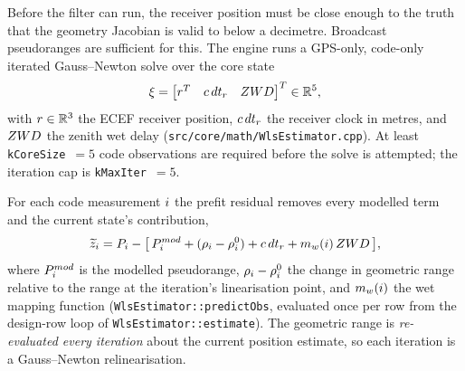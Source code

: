 \documentclass[main.tex]{subfiles}
\begin{document}
Before the filter can run, the receiver position must be close enough to
the truth that the geometry Jacobian
 is valid to below a
decimetre.  Broadcast pseudoranges are sufficient for this.  The engine
runs a GPS-only, code-only iterated Gauss--Newton solve over the core
state
\begin{equation}
\xi = \begin{bmatrix} r^{T} & c\,dt_r & ZWD \end{bmatrix}^{T}
\in\mathbb{R}^{5},
\label{eq:estinfra-wls-state}
\end{equation}
with $r\in\mathbb{R}^3$ the ECEF receiver position, $c\,dt_r$
the receiver clock in metres, and $ZWD$ the zenith wet delay
(\texttt{src/core/math/WlsEstimator.cpp}).  At least
\texttt{kCoreSize}~$=5$ code observations are required before the solve is
attempted; the iteration cap is \texttt{kMaxIter}~$=5$.

For each code measurement $i$ the prefit residual removes every modelled
term and the current state's contribution,
\begin{equation}
\widetilde{z}_i = P_i
  - \bigl[\,P_i^{mod} + (\rho_i - \rho_i^{0})
  + c\,dt_r + m_w(i)\,ZWD \,\bigr],
\label{eq:estinfra-wls-prefit}
\end{equation}
where $P_i^{mod}$ is the modelled pseudorange,
$\rho_i-\rho_i^{0}$ the change in geometric range relative
to the range at the iteration's linearisation point, and $m_w(i)$ the
wet mapping function (\texttt{WlsEstimator::predictObs}, evaluated once per
row from the design-row loop of \texttt{WlsEstimator::estimate}).  The
geometric range is \emph{re-evaluated every iteration} about the current
position estimate, so each iteration is a Gauss--Newton
relinearisation.
\end{document}

